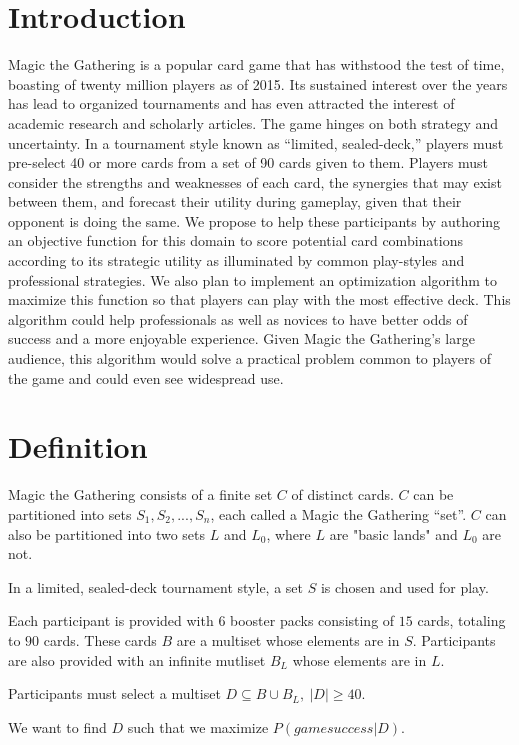 \documentclass[12pt,letterpaper]{report}
\begin{document}
\section{Introduction}

Magic the Gathering is a popular card game that has withstood the test of time,
boasting of twenty million players as of 2015.
Its sustained interest over the years has lead to organized tournaments
and has even attracted the interest of academic research and scholarly articles.
The game hinges on both strategy and uncertainty.
In a tournament style known as \enquote{limited, sealed-deck,}
players must pre-select 40 or more cards from a set of 90 cards given to them.
Players must consider the strengths and weaknesses of each card,
the synergies that may exist between them,
and forecast their utility during gameplay,
given that their opponent is doing the same.
We propose to help these participants by authoring an objective function for this
domain to score potential card combinations according to its strategic utility
as illuminated by common play-styles and professional strategies.
We also plan to implement an optimization algorithm to maximize this function
so that players can play with the most effective deck.
This algorithm could help professionals as well as novices to have better odds of success
and a more enjoyable experience.
Given Magic the Gathering’s large audience,
this algorithm would solve a practical problem common to players of the game
and could even see widespread use.

\section{Definition}

Magic the Gathering consists of a finite set $ C $ of distinct cards.
$ C $ can be partitioned into sets $ S_1, S_2, ..., S_n $, each called a Magic the Gathering \enquote{set}.
$ C $ can also be partitioned into two sets $ L $ and $ L_0 $, where $ L $ are "basic lands" and $ L_0 $ are not.

In a limited, sealed-deck tournament style,
a set $ S $ is chosen and used for play.

Each participant is provided with 6 booster packs consisting of $ 15 $ cards, totaling to $ 90 $ cards.
These cards $ B $ are a multiset whose elements are in $ S $.
Participants are also provided with an infinite mutliset $ B_L $ whose elements are in $ L $.

Participants must select a multiset $ D \subseteq B \cup B_L , \ |D| \ge 40 $.

We want to find $ D $ such that we maximize $ P(game success | D) $.
\end{document}
